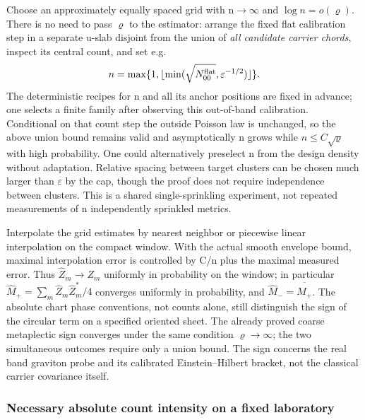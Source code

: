 \documentclass[11pt]{article}
\begin{document}
Choose an approximately equally spaced grid with n\(\to\)\(\infty\) and \(\log n=o(\varrho)\). There is no need to pass \(\varrho\) to the estimator: arrange the fixed flat calibration step in a separate u-slab disjoint from the union of \emph{all candidate carrier chords}, inspect its central count, and set e.g.
\[
 n=\max\{1,\lfloor\min(\sqrt{N_{00}^{\rm flat}},\varepsilon^{-1/2})\rfloor\}.
\]
The deterministic recipes for n and all its anchor positions are fixed in advance; one selects a finite family after observing this out-of-band calibration. Conditional on that count step the outside Poisson law is unchanged, so the above union bound remains valid and asymptotically n grows while \(n\le C\sqrt\varrho\) with high probability. One could alternatively preselect n from the design density without adaptation. Relative spacing between target clusters can be chosen much larger than \(\varepsilon\) by the cap, though the proof does not require independence between clusters. This is a shared single-sprinkling experiment, not repeated measurements of n independently sprinkled metrics.

Interpolate the grid estimates by nearest neighbor or piecewise linear interpolation on the compact window. With the actual smooth envelope bound, maximal interpolation error is controlled by C/n plus the maximal measured error. Thus \(\widehat Z_m\to Z_m\) uniformly in probability on the window; in particular
\(\widehat M_+=\sum_m\widehat Z_m\widehat Z_m^*/4\)
converges uniformly in probability, and \(\widehat M_-=\overline{\widehat M_+}\). The absolute chart phase conventions, not counts alone, still distinguish the sign of the circular term on a specified oriented sheet. The already proved coarse metaplectic sign converges under the same condition \(\varrho\to\infty\); the two simultaneous outcomes require only a union bound. The sign concerns the real band graviton probe and its calibrated Einstein--Hilbert bracket, not the classical carrier covariance itself.

\subsubsection{Necessary absolute count intensity on a fixed laboratory}\label{necessary-absolute-count-intensity-on-a-fixed-laboratory}
\end{document}
